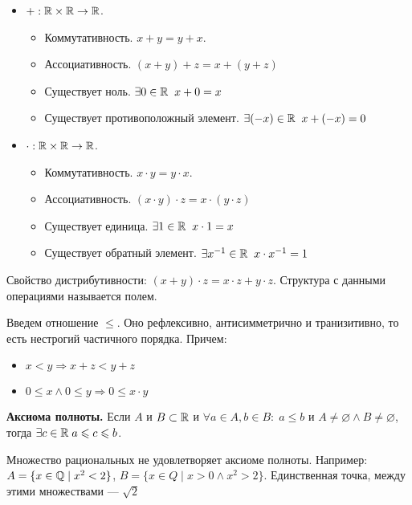 \begin{itemize}
    \item $+: \mathbb{R} \times \mathbb{R} \to \mathbb{R}$.
        \begin{itemize}
            \item Коммутативность. $x+y=y+x$.
            \item Ассоциативность.  $(x+y)+z=x+(y+z)$
            \item Существует ноль.  $\exists 0 \in \mathbb{R} \; \; x + 0 = x$
            \item Существует противоположный элемент. $\exists (-x) \in \mathbb{R} \; \; x+(-x) = 0$
        \end{itemize}
    \item $\cdot: \mathbb{R} \times \mathbb{R} \to \mathbb{R}$.
        \begin{itemize}
            \item Коммутативность. $x\cdot y=y\cdot x$.
            \item Ассоциативность.  $(x\cdot y)\cdot z=x\cdot (y\cdot z)$
            \item Существует единица.  $\exists 1 \in \mathbb{R} \; \; x \cdot 1 = x$
            \item Существует обратный элемент. $\exists x^{-1} \in \mathbb{R} \; \; x \cdot x^{-1} = 1$
        \end{itemize}
\end{itemize}
Свойство дистрибутивности: $(x+y) \cdot z = x \cdot z + y \cdot z$. Структура с данными операциями называется полем.

Введем отношение $\le$. Оно рефлексивно, антисимметрично и транизитивно, то есть нестрогий частичного порядка. Причем:
\begin{itemize}
    \item $x< y \Rightarrow x+z < y+z$
    \item  $0 \le x \land 0 \le y \Rightarrow 0 \le x\cdot y$
\end{itemize}
\textbf{Аксиома полноты.} Если $A$ и $B \subset \mathbb{R}$ и $\forall a \in A, b \in B: \; a \le b$ и $A \neq \varnothing \land B \neq \varnothing$, тогда $\exists c \in \mathbb{R}\; a \leqslant c \leqslant b$.
\begin{remark}
    Множество рациональных не удовлетворяет аксиоме полноты. Например: $A = \{x \in \mathbb{Q} \; \vert \; x^2 < 2\}$,  $B = \{x \in Q \; \vert \; x>0 \land x^2 > 2\}$. Единственная точка, между этими множествами --- $\sqrt{2}$ 
\end{remark}

